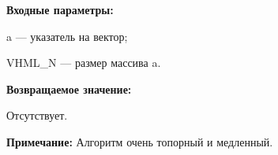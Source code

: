 \textbf{Входные параметры:}  
 
a --- указатель на вектор;
 
VHML\_N --- размер массива a.

\textbf{Возвращаемое значение:}

Отсутствует.

\textbf{Примечание:}
 Алгоритм очень топорный и медленный.